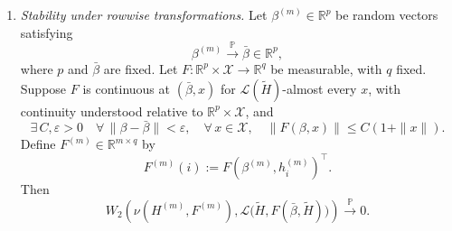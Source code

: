 \begin{lemma}
\begin{enumerate}[wide]
            \item \emph{Stability under rowwise transformations.}
            Let $\beta^{(m)}\in\mathbb R^p$ be random vectors satisfying
            \[
                \beta^{(m)}
                \xrightarrow{\mathbb P}
                \bar\beta\in\mathbb R^p,
            \]
            where $p$ and $\bar\beta$ are fixed.
            Let
            \(
                F:\mathbb R^p\times\mathcal X\longrightarrow\mathbb R^q
            \)
            be measurable, with $q$ fixed.
            Suppose $F$ is continuous at $(\bar\beta,x)$ for
            $\mathscr L(\tilde H)$-almost every $x$, with continuity
            understood relative to $\mathbb R^p\times\mathcal X$, and
            \[
                \exists\,C,\varepsilon>0
                \quad
                \forall\,\|\beta-\bar\beta\|<\varepsilon,
                \quad
                \forall\,x\in\mathcal X,
                \quad
                \|F(\beta,x)\|\leq C(1+\|x\|).
            \]
            Define $F^{(m)}\in\mathbb R^{m\times q}$ by
            \[
                F^{(m)}(i)
                :=
                F(\beta^{(m)},h_i^{(m)})^\top.
            \]
            Then
            \[
                W_2\left(
                    \nu(H^{(m)},F^{(m)}),
                    \mathscr L\bigl(
                        \tilde H,F(\bar\beta,\tilde H)
                    \bigr)
                \right)
                \xrightarrow{\mathbb P}0.
            \]
        \end{enumerate}
        \end{lemma}
        

